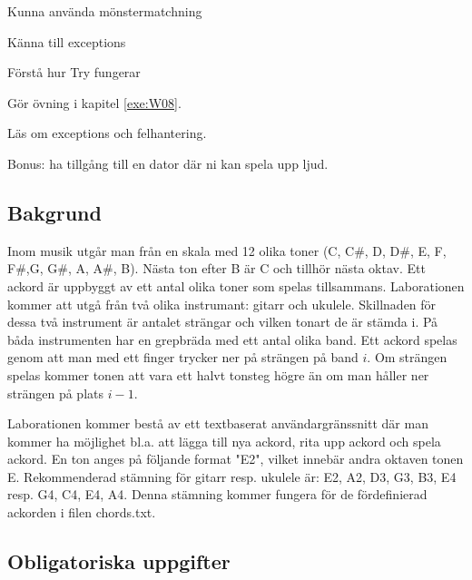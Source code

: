 

\Lab{\LabWeekEIGHT}

\begin{Goals}
\item Kunna använda mönstermatchning
\item Känna till exceptions
\item Förstå hur Try fungerar

\end{Goals}

\begin{Preparations}
\item Gör övning {\tt \ExeWeekEIGHT} i kapitel \ref{exe:W08}.
\item Läs om exceptions och felhantering.
\item Bonus: ha tillgång till en dator där ni kan spela upp ljud.
\end{Preparations}

\subsection{Bakgrund}
Inom musik utgår man från en skala med 12 olika toner (C, C\#, D, D\#, E, F, F\#,G, G\#, A, A\#, B). Nästa ton efter B är C och tillhör nästa oktav. Ett ackord är uppbyggt av ett antal olika toner som spelas tillsammans. Laborationen kommer att utgå från två olika instrumant: gitarr och ukulele. Skillnaden för dessa två instrument är antalet strängar och vilken tonart de är stämda i. På båda instrumenten har en grepbräda med ett antal olika band. Ett ackord spelas genom att man med ett finger trycker ner på strängen på band $i$. Om strängen spelas kommer tonen att vara ett halvt tonsteg högre än om man håller ner strängen på plats $i-1$.

Laborationen kommer bestå av ett textbaserat användargränssnitt där man kommer ha möjlighet bl.a. att lägga till nya ackord, rita upp ackord och spela ackord. En ton anges på följande format "E2", vilket innebär andra oktaven tonen E. Rekommenderad stämning för gitarr resp. ukulele är: E2, A2, D3, G3, B3, E4 resp. G4, C4, E4, A4. Denna stämning kommer fungera för de fördefinierad ackorden i filen chords.txt.

\subsection{Obligatoriska uppgifter}

